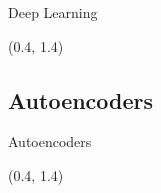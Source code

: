 \documentclass[english,aspectratio=169,dvipsnames]{beamer}
\begin{document}
\begin{frame}{Deep Learning}{}
    
    \begin{textblock}{5}(0.4, 1.4)
        
    \end{textblock}
    
\end{frame}

\subsection{Autoencoders}

\begin{frame}{Autoencoders}{}
	\begin{textblock}{5}(0.4, 1.4)
        
    \end{textblock}
\end{frame}
\end{document}
